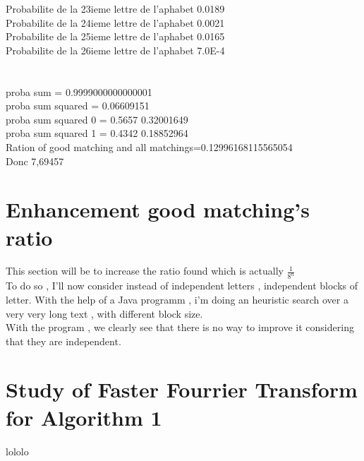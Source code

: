 \documentclass{article}
\begin{document}
Probabilite de la 23ieme lettre de l'aphabet 0.0189\\
Probabilite de la 24ieme lettre de l'aphabet 0.0021\\
Probabilite de la 25ieme lettre de l'aphabet 0.0165\\
Probabilite de la 26ieme lettre de l'aphabet 7.0E-4\\
\\
\\
proba sum = 0.9999000000000001\\
proba sum squared = 0.06609151\\
proba sum squared 0 = 0.5657 0.32001649\\
proba sum squared 1 = 0.4342 0.18852964\\
Ration of good matching and all matchings=0.12996168115565054\\
Donc 7,69457

\section{Enhancement good matching's ratio}

This section will be to increase the ratio found which is actually $\frac{1}{8^n}$\\
To do so , I'll now consider instead of independent letters , independent blocks of letter.
With the help of a Java programm , i'm doing an heuristic search over a very very long text , with different block size.\\
With the program , we clearly see that there is no way to improve it considering that they are independent.\\

\section{Study of Faster Fourrier Transform for Algorithm 1}
lololo\\
\end{document}
